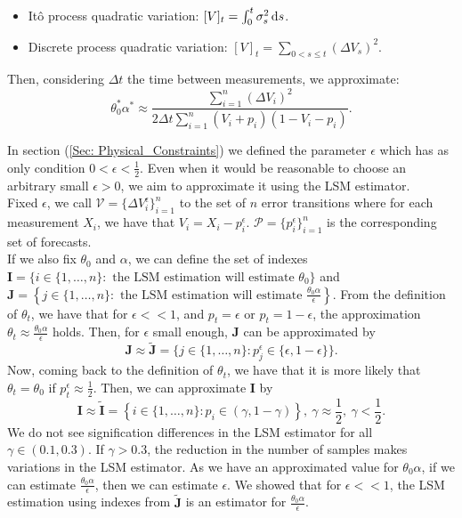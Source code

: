 \documentclass[11pt]{article}
\theoremstyle{definition}
\begin{document}
\begin{itemize}
\begin{itemize}
\item It\^o process quadratic variation: $[V]_t=\int_0^t\sigma_s^2\dif s$.
\item Discrete process quadratic variation: $[V]_t=\sum_{0<s\leq t}(\Delta V_s)^2$.

\end{itemize}

Then, considering $\Delta t$ the time between measurements, we approximate:
\begin{equation}
\theta_0^*\alpha^*\approx\frac{\sum_{i=1}^n(\Delta V_i)^2}{2\Delta t\sum_{i=1}^n(V_i+p_i)(1-V_i-p_i)}.
\label{Eq-2}
\end{equation}

\end{itemize}

In section (\ref{Sec: Physical_Constraints}) we defined the parameter $\epsilon$ which has as only condition $0<\epsilon<\frac{1}{2}$. Even when it would be reasonable to choose an arbitrary small $\epsilon>0$, we aim to approximate it using the LSM estimator.\\

Fixed $\epsilon$, we call $\mathcal{V}=\{\Delta V_i^\epsilon\}_{i=1}^n$ to the set of $n$ error transitions where for each measurement $X_i$, we have that $V_i=X_i-p_i^\epsilon$. $\mathcal{P}=\{p_i^\epsilon\}_{i=1}^n$ is the corresponding set of forecasts.\\
If we also fix $\theta_0$ and $\alpha$, we can define the set of indexes $\mathbf{I}=\{i\in\{1,\dots,n\}:\text{ the LSM estimation will estimate }\theta_0\}$ and $\mathbf{J}=\left\{j\in\{1,\dots,n\}:\text{ the LSM estimation will estimate }\frac{\theta_0\alpha}{\epsilon}\right\}$. From the definition of $\theta_t$, we have that for $\epsilon<<1$, and $p_t=\epsilon$ or $p_t=1-\epsilon$, the approximation $\theta_t\approx\frac{\theta_0\alpha}{\epsilon}$ holds. Then, for $\epsilon$ small enough, $\mathbf{J}$ can be approximated by $$\mathbf{J}\approx\tilde{\mathbf{J}}=\{j\in\{1,\dots,n\}:p_j^\epsilon\in\{\epsilon,1-\epsilon\}\}.$$
Now, coming back to the definition of $\theta_t$, we have that it is more likely that $\theta_t=\theta_0$ if $p_t^\epsilon\approx\frac{1}{2}$. Then, we can approximate $\mathbf{I}$ by $$\mathbf{I}\approx\tilde{\mathbf{I}}=\left\{i\in\{1,\dots,n\}:p_i\in(\gamma,1-\gamma)\right\},\ \gamma\approx\frac{1}{2},\ \gamma<\frac{1}{2}.$$
We do not see signification differences in the LSM estimator for all $\gamma\in(0.1,0.3)$. If $\gamma>0.3$, the reduction in the number of samples makes variations in the LSM estimator. As we have an approximated value for $\theta_0\alpha$, if we can estimate $\frac{\theta_0\alpha}{\epsilon}$, then we can estimate $\epsilon$. We showed that for $\epsilon<<1$, the LSM estimation using indexes from $\tilde{\mathbf{J}}$ is an estimator for $\frac{\theta_0\alpha}{\epsilon}$.
\end{document}
